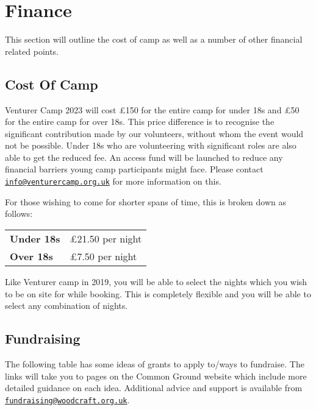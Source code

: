 \documentclass[a4paper, 10pt]{report}
\begin{document}
\chapter{Finance}
This section will outline the cost of camp as well as a number of other financial related points.
\section{Cost Of Camp}
Venturer Camp 2023 will cost £150 for the entire camp for under 18s and £50 for the entire camp for over 18s. This price difference is to recognise the significant contribution made by our volunteers, without whom the event would not be possible. Under 18s who are volunteering with significant roles are also able to get the reduced fee. An access fund will be launched to reduce any financial barriers young camp participants might face. Please contact \href{mailto:info@venturercamp.org.uk}{\texttt{info@venturercamp.org.uk}} for more information on this.

For those wishing to come for shorter spans of time, this is broken down as follows:
\begin{table}[H]
    \centering
\begin{tabularx}{\textwidth}{ll}
    \textbf{Under 18s} & £21.50 per night \\
    \textbf{Over 18s} & £7.50 per night 
\end{tabularx}
\end{table}
Like Venturer camp in 2019, you will be able to select the nights which you wish to be on site for while booking. This is completely flexible and you will be able to select any combination of nights.

\section{Fundraising}
The following table has some ideas of grants to apply to/ways to fundraise. The links will take you to pages on the Common Ground website which include more detailed guidance on each idea. Additional advice and support is available from \href{mailto:fundraising@woodcraft.org.uk}{\texttt{fundraising@woodcraft.org.uk}}. 
\end{document}
